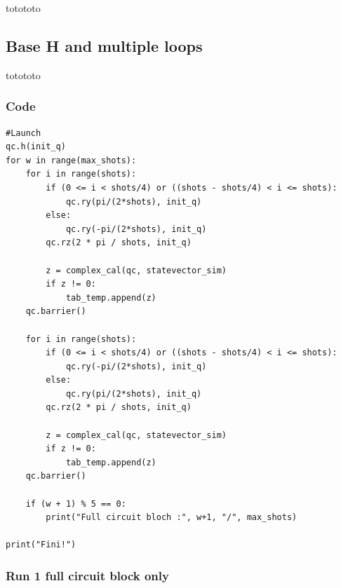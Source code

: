 totototo




\subsection{Base H and multiple loops}
totototo

\subsubsection{Code}
\begin{lstlisting}
#Launch
qc.h(init_q)
for w in range(max_shots):
    for i in range(shots):
        if (0 <= i < shots/4) or ((shots - shots/4) < i <= shots):
            qc.ry(pi/(2*shots), init_q)
        else:
            qc.ry(-pi/(2*shots), init_q)
        qc.rz(2 * pi / shots, init_q)
        
        z = complex_cal(qc, statevector_sim)
        if z != 0:
            tab_temp.append(z)
    qc.barrier()
    
    for i in range(shots):
        if (0 <= i < shots/4) or ((shots - shots/4) < i <= shots):
            qc.ry(-pi/(2*shots), init_q)
        else:
            qc.ry(pi/(2*shots), init_q)
        qc.rz(2 * pi / shots, init_q)
        
        z = complex_cal(qc, statevector_sim)
        if z != 0:
            tab_temp.append(z)
    qc.barrier()

    if (w + 1) % 5 == 0:
        print("Full circuit bloch :", w+1, "/", max_shots)

print("Fini!")
\end{lstlisting}

\subsubsection{Run 1 full circuit block only}

